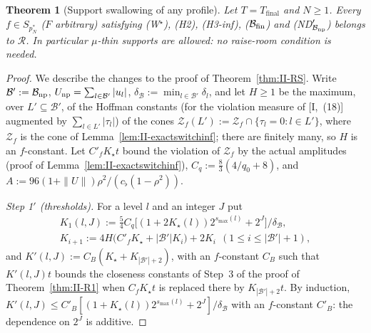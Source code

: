 \documentclass[10pt]{amsart}
\newtheorem{theorem}{Theorem}[section]
\theoremstyle{definition}
\theoremstyle{remark}
\newcommand{\Rec}{\mathcal R}
\begin{document}
\begin{theorem}[Support swallowing of any profile]\label{thm:II-RSstar}
Let $T=T_{\mathrm{final}}$ and $N\ge1$.  Every $f\in S_{p_N^*}$ \textup{(}$F$
arbitrary\textup{)} satisfying \textup{(W$^\star$)}, \textup{(H2)},
\textup{(H3-inf)}, \textup{($\mathcal B_{\rm fin}$)} and
\textup{(ND$'_{\mathcal B_{\rm np}}$)} belongs to $\Rec$.  In particular
$\mu$-thin supports are allowed: no raise-room condition is needed.
\end{theorem}

\begin{proof}
We describe the changes to the proof of Theorem~\ref{thm:II-RS}.  Write
$\mathcal B':=\mathcal B_{\rm np}$, $U_{\rm np}=\sum_{l\in\mathcal B'}|u_l|$,
$\delta_{\mathcal B}:=\min_{l\in\mathcal B'}\delta_l$, and let $H\ge1$ be the
maximum, over $L'\subseteq\mathcal B'$, of the Hoffman constants (for the
violation measure of [I,~(18)] augmented by $\sum_{l\in L'}|\tau_l|$) of the
cones $\mathcal Z_f(L'):=\mathcal Z_f\cap\{\tau_l=0:l\in L'\}$, where
$\mathcal Z_f$ is the cone of Lemma~\ref{lem:II-exactswitchinf}; there are
finitely many, so $H$ is an $f$-constant.  Let $C'_fK_\star t$ bound the
violation of $\mathcal Z_f$ by the actual amplitudes (proof of
Lemma~\ref{lem:II-exactswitchinf}), $C_q:=\frac83(4/q_0+8)$, and
$A:=96(1+\|U\|)\rho^2/(c_\flat(1-\rho^2))$.

\emph{Step 1$'$ (thresholds).}  For a level $l$ and an integer $J$ put
\begin{gather*}
 K_1(l,J):=\tfrac54C_q\big[(1+2K_\star(l))2^{s_{\max}(l)}+2^J\big]/
 \delta_{\mathcal B},\\ K_{i+1}:=4H\big(C'_fK_\star+|\mathcal B'|K_i
 \big)+2K_i\ \ (1\le i\le|\mathcal B'|+1),
\end{gather*}
and $K'(l,J):=C_B(K_\star+K_{|\mathcal B'|+2})$, with an $f$-constant $C_B$
such that $K'(l,J)t$ bounds the closeness constants of Step~3 of the proof
of Theorem~\ref{thm:II-R1} when $C_fK_\star t$ is replaced there by
$K_{|\mathcal B'|+2}t$.  By induction, $K'(l,J)\le C'_B[(1+K_\star(l))
2^{s_{\max}(l)}+2^J]/\delta_{\mathcal B}$ with an $f$-constant $C'_B$: the
dependence on $2^J$ is additive.


\end{proof}
\end{document}
